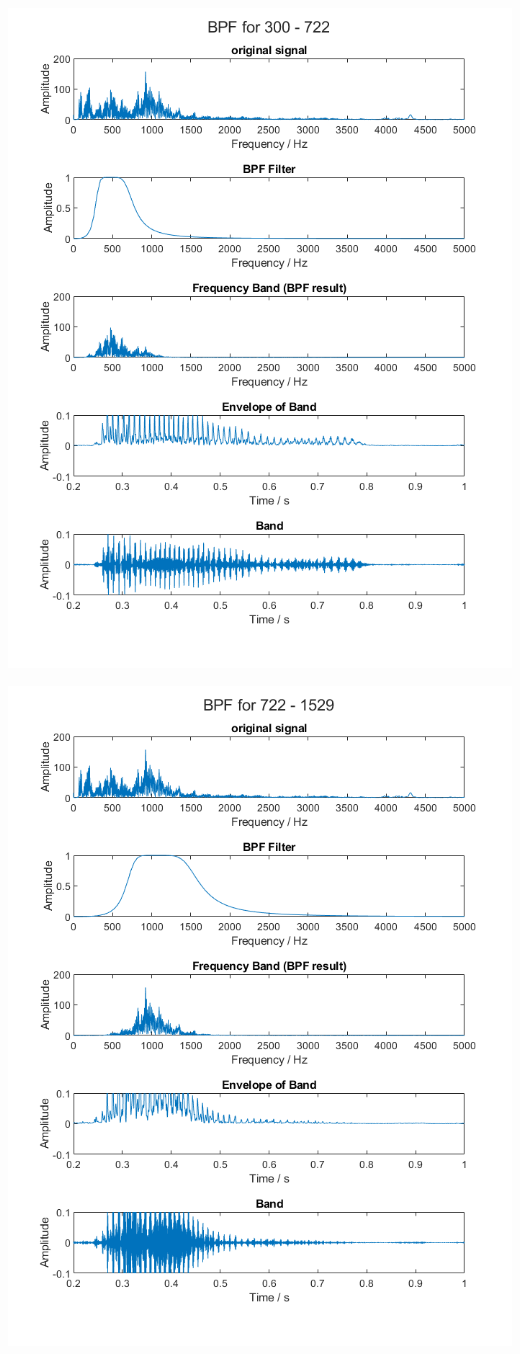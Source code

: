 \documentclass[11pt]{article}
\begin{document}
\includegraphics[height=\textheight]{output/band1.png}

\includegraphics[height=\textheight]{output/band2.png}
\end{document}
